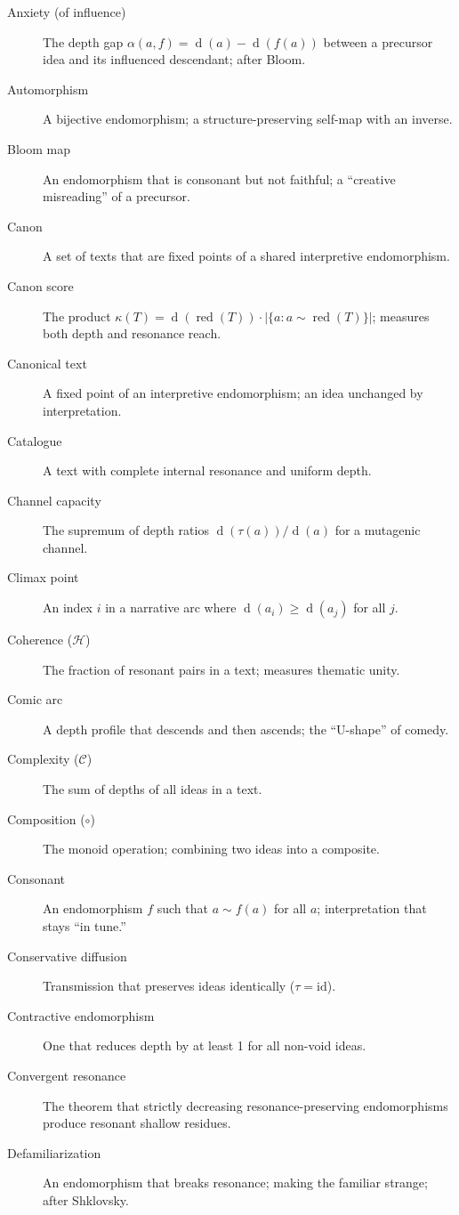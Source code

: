 \documentclass[11pt,openany]{book}
\theoremstyle{definition}
\theoremstyle{plain}
\theoremstyle{remark}
\newcommand{\compose}{\circ}                 %
\newcommand{\res}{\sim}                      %
\newcommand{\depth}{\operatorname{d}}       %
\newcommand{\transmit}{\tau}                 %
\begin{document}
\begin{description}
\item[Anxiety (of influence)] The depth gap $\alpha(a, f) = \depth(a) - \depth(f(a))$ between a precursor idea and its influenced descendant; after Bloom.
\item[Automorphism] A bijective endomorphism; a structure-preserving self-map with an inverse.
\item[Bloom map] An endomorphism that is consonant but not faithful; a ``creative misreading'' of a precursor.
\item[Canon] A set of texts that are fixed points of a shared interpretive endomorphism.
\item[Canon score] The product $\kappa(T) = \depth(\operatorname{red}(T)) \cdot |\{a : a \res \operatorname{red}(T)\}|$; measures both depth and resonance reach.
\item[Canonical text] A fixed point of an interpretive endomorphism; an idea unchanged by interpretation.
\item[Catalogue] A text with complete internal resonance and uniform depth.
\item[Channel capacity] The supremum of depth ratios $\depth(\transmit(a))/\depth(a)$ for a mutagenic channel.
\item[Climax point] An index $i$ in a narrative arc where $\depth(a_i) \geq \depth(a_j)$ for all $j$.
\item[Coherence ($\mathcal{H}$)] The fraction of resonant pairs in a text; measures thematic unity.
\item[Comic arc] A depth profile that descends and then ascends; the ``U-shape'' of comedy.
\item[Complexity ($\mathcal{C}$)] The sum of depths of all ideas in a text.
\item[Composition ($\compose$)] The monoid operation; combining two ideas into a composite.
\item[Consonant] An endomorphism $f$ such that $a \res f(a)$ for all $a$; interpretation that stays ``in tune.''
\item[Conservative diffusion] Transmission that preserves ideas identically ($\transmit = \mathrm{id}$).
\item[Contractive endomorphism] One that reduces depth by at least 1 for all non-void ideas.
\item[Convergent resonance] The theorem that strictly decreasing resonance-preserving endomorphisms produce resonant shallow residues.
\item[Defamiliarization] An endomorphism that breaks resonance; making the familiar strange; after Shklovsky.

\end{description}
\end{document}
